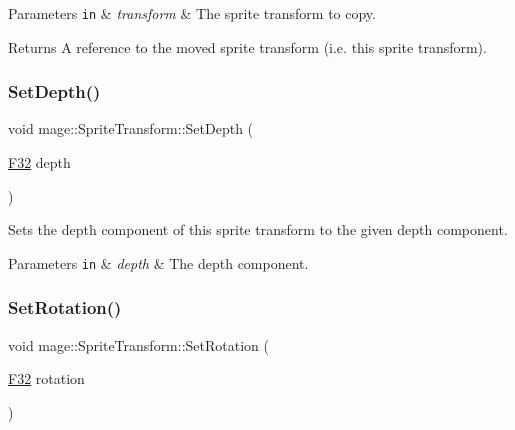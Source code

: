 \begin{DoxyParams}[1]{Parameters}
\mbox{\tt in}  & {\em transform} & The sprite transform to copy. \\
\hline
\end{DoxyParams}
\begin{DoxyReturn}{Returns}
A reference to the moved sprite transform (i.\+e. this sprite transform). 
\end{DoxyReturn}
\mbox{\label{classmage_1_1_sprite_transform_a99da2aa3c134db3f4a72660befe1ca9a}} 
\subsubsection{\texorpdfstring{Set\+Depth()}{SetDepth()}}
{\footnotesize\ttfamily void mage\+::\+Sprite\+Transform\+::\+Set\+Depth (\begin{DoxyParamCaption}\item[{\mbox{\hyperlink{namespacemage_aa97e833b45f06d60a0a9c4fc22ae02c0}{F32}}}]{depth }\end{DoxyParamCaption})\hspace{0.3cm}{\ttfamily [noexcept]}}

Sets the depth component of this sprite transform to the given depth component.


\begin{DoxyParams}[1]{Parameters}
\mbox{\tt in}  & {\em depth} & The depth component. \\
\hline
\end{DoxyParams}
\mbox{\label{classmage_1_1_sprite_transform_aa5e9162146729dd579e2409e348eafa2}} 
\subsubsection{\texorpdfstring{Set\+Rotation()}{SetRotation()}}
{\footnotesize\ttfamily void mage\+::\+Sprite\+Transform\+::\+Set\+Rotation (\begin{DoxyParamCaption}\item[{\mbox{\hyperlink{namespacemage_aa97e833b45f06d60a0a9c4fc22ae02c0}{F32}}}]{rotation }\end{DoxyParamCaption})\hspace{0.3cm}{\ttfamily [noexcept]}}

